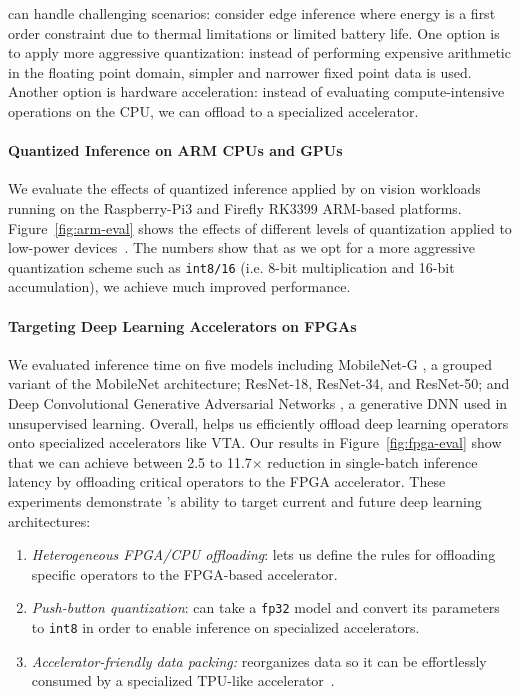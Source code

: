   \relay can handle challenging scenarios: consider edge inference where energy is a first order
    constraint due to thermal limitations or limited battery life.
  One option is to apply more aggressive quantization: instead of performing expensive
    arithmetic in the floating point domain, simpler and narrower fixed point data is used.
  Another option is hardware acceleration: instead of evaluating
    compute-intensive operations on the CPU, we can offload to a specialized accelerator.

  \paragraph{Quantized Inference on ARM CPUs and GPUs}
  We evaluate the effects of quantized inference applied by \relay on vision workloads running
  on the Raspberry-Pi3 and Firefly RK3399 ARM-based platforms.
  Figure~\ref{fig:arm-eval} shows the effects of different levels
    of quantization applied to low-power devices~\cite{relay_arixv}.
  The numbers show that as we opt for a more aggressive quantization scheme such as \texttt{int8/16} (i.e. 8-bit multiplication and 16-bit accumulation), we achieve much improved performance.

  \paragraph{Targeting Deep Learning Accelerators on FPGAs}
  We evaluated inference time on five models including MobileNet-G \cite{mobilenet}, a grouped variant of the MobileNet architecture; ResNet-18, ResNet-34, and ResNet-50\cite{resnet}; and Deep Convolutional Generative Adversarial Networks \cite{dcgan}, a generative DNN used in unsupervised learning.
  Overall, \relay helps us efficiently offload deep learning operators onto specialized accelerators like VTA.
  Our results in Figure~\ref{fig:fpga-eval} show that we can achieve between 2.5 to 11.7$\times$ reduction in single-batch inference latency by offloading critical operators to the FPGA accelerator.
  These experiments demonstrate \relay's ability to target current and future deep learning architectures:
  \begin{enumerate}
    \item \textit{Heterogeneous FPGA/CPU offloading}: \relay lets us define the rules for offloading specific operators to the FPGA-based accelerator.
    \item \textit{Push-button quantization}: \relay can take a \texttt{fp32} model and convert its parameters to \texttt{int8} in order to enable inference on specialized accelerators.
    \item \textit{Accelerator-friendly data packing:} \relay reorganizes data so it can be effortlessly consumed by a specialized TPU-like accelerator~\cite{tpuv1}.
  \end{enumerate}

